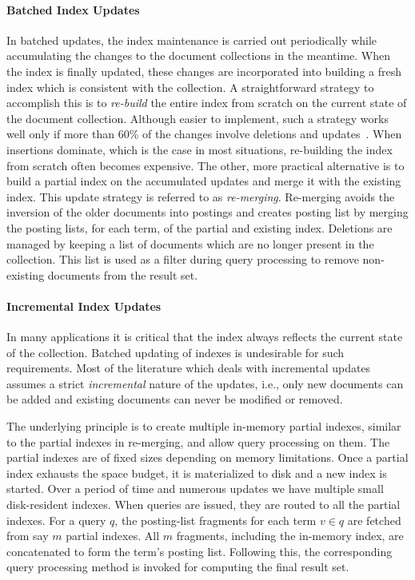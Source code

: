 \paragraph{Batched Index Updates}
 In batched updates, the index maintenance is carried out periodically while accumulating the changes to the document collections in the meantime. When the index is finally updated, these changes are incorporated into building a fresh index which is consistent with the collection. A straightforward strategy to accomplish this is to \emph{re-build} the entire index from scratch on the current state of the document collection. Although easier to implement, such a strategy works well only if more than 60\% of the changes involve deletions and updates~\cite{Buttcher:2010fk}. When insertions dominate, which is the case in most situations, re-building the index from scratch often becomes expensive. The other, more practical alternative is to build a partial index on the accumulated updates and merge it with the existing index. This update strategy is referred to as \emph{re-merging}. Re-merging avoids the inversion of the older documents into postings and creates posting list by merging the posting lists, for each term, of the partial and existing index. Deletions are managed by keeping a list of documents which are no longer present in the collection. This list is used as a filter during query processing to remove non-existing documents from the result set.

\paragraph{Incremental Index Updates}
In many applications it is critical that the index always reflects the current state of the collection. Batched updating of indexes is undesirable for such requirements. Most of the literature which deals with incremental updates assumes a strict \emph{incremental} nature of the updates, i.e.,
only new documents can be added and existing documents can never be modified or removed. 

The underlying principle is to create multiple in-memory partial indexes, similar to the partial indexes in re-merging, and allow query processing on them. The partial indexes are of fixed sizes depending on memory limitations. Once a partial index exhausts the space budget, it is materialized to disk and a new index is started. Over a period of time and numerous updates we have multiple small disk-resident indexes. When queries are issued, they are routed to all the partial indexes. For a query $q$, the posting-list fragments for each term $v \in q$ are fetched from say $m$ partial indexes. All $m$ fragments, including the in-memory index, are concatenated to form the term's posting list. Following this, the corresponding query processing method is invoked for computing the final result set. 

